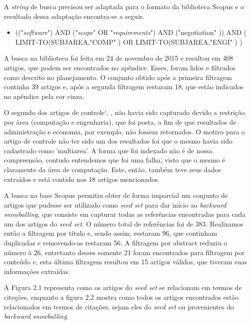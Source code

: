 A \textit{string} de busca precisou ser adaptada para o formato da biblioteca
Scopus e o resultado dessa adaptação encontra-se a seguir.
 
 \begin{itemize}
\setlength{\itemsep}{1pt}
\setlength{\itemindent}{20pt}
\item {(("\textit{software}") AND ("\textit{scope}" OR "\textit{requirements}") AND ("negotiation" ))
AND ( LIMIT-TO(SUBJAREA,"COMP" ) OR LIMIT-TO(SUBJAREA,"ENGI" ) )}
\end{itemize}
 
A busca na biblioteca foi feita em 24 de novembro de 2015 e resultou em 408
artigos, que podem ser encontrados no apêndice. Esses, foram lidos e
filtrados como descrito no planejamento.
O conjunto obtido após a primeira filtragem continha 39 artigos e, após
a segunda filtragem restaram 18, que estão indicados no apêndice pela
cor cinza.

O segundo dos artigos de controle`, \cite{khan2014integration}, não havia sido
capturado devido a restrição por área (computação e engenharia), que foi posta,
a fim de que resultados de administração e economia, por exemplo, não fossem retornados. O motivo
para o artigo de controle não ter sido um dos resultados foi que o mesmo havia
sido cadastrado como 'multiarea'. A forma que foi indexado não é de nossa
compreensão, contudo entendemos que foi uma falha, visto que o mesmo é
claramente da área de computação. Este, então, também teve seus dados extraídos
e está contido nos 18 artigos mencionados.

 A busca na base Scopus permitiu obter de forma imparcial um conjunto de artigos que pudesse ser utilizado
 como \textit{seed set} para dar início ao \textit{backward snowballing}, que
 consiste em capturar todas as referências encontradas para cada um dos artigos
 do \textit{seed set}. O número total de referências foi de 383. Realizamos
 então a filtragem por título e, sendo assim, restaram 96, que continham
 duplicadas e removendo-as restaram 56. A filtragem por abstract reduziu o número à 26, entretanto desses somente 21 foram encontrados para filtragem por conteúdo e, esta última filtragem resultou em 15 artigos válidos,
que tiveram suas informações extraídas.

A Figura 2.1 representa como os artigos do
\textit{seed set} se relacionam em termos de citeções, enquanto a figura 2.2
mostra como todos os artigos encontrados estão relacionados em termos de
citações, sejam eles do \textit{seed set} ou provenientes do \textit{backward
snowballing}.

